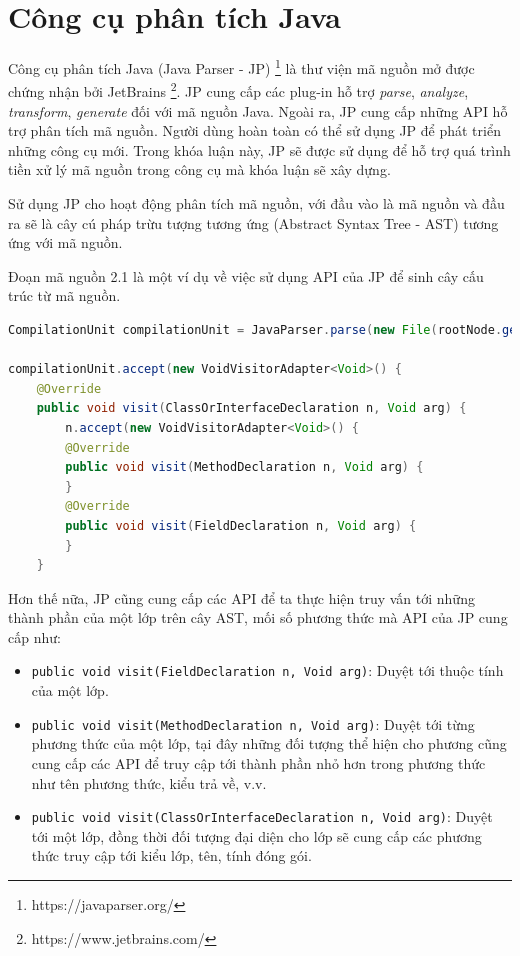 \documentclass[12pt]{report}
\begin{document}
\section{Công cụ phân tích Java}
Công cụ phân tích Java (Java Parser - JP) \footnote{https://javaparser.org/} là thư viện mã nguồn mở được chứng nhận bởi JetBrains \footnote{https://www.jetbrains.com/}. JP cung cấp các plug-in hỗ trợ \textit{parse}, \textit{analyze}, \textit{transform}, \textit{generate } đối với mã nguồn Java. Ngoài ra, JP cung cấp những API hỗ trợ phân tích mã nguồn. Người dùng hoàn toàn có thể sử dụng JP để phát triển những công cụ mới. Trong khóa luận này, JP sẽ được sử dụng để hỗ trợ quá trình tiền xử lý mã nguồn trong công cụ mà khóa luận sẽ xây dựng.

\noindent Sử dụng JP cho hoạt động phân tích mã nguồn, với đầu vào là mã nguồn và đầu ra sẽ là cây cú pháp trừu tượng tương ứng (Abstract Syntax Tree - AST) tương ứng với mã nguồn.

\noindent Đoạn mã nguồn 2.1 là một ví dụ về việc sử dụng API của  JP để sinh cây cấu trúc từ mã nguồn. 
\newpage
\begin{lstlisting}[language=Java,
caption={Sử dụng API của JavaParser để sinh cây cú pháp trừu tượng từ mã nguồn},label={code:jdt-ast-gen}]
CompilationUnit compilationUnit = JavaParser.parse(new File(rootNode.getAbsolutePath()));

compilationUnit.accept(new VoidVisitorAdapter<Void>() {
	@Override
	public void visit(ClassOrInterfaceDeclaration n, Void arg) {
		n.accept(new VoidVisitorAdapter<Void>() {
		@Override
		public void visit(MethodDeclaration n, Void arg) {
		}
		@Override
		public void visit(FieldDeclaration n, Void arg) {
		}
	}
\end{lstlisting}
Hơn thế nữa, JP cũng cung cấp các API để ta thực hiện truy vấn tới những thành phần của một lớp trên cây AST, mối số phương thức mà API của JP cung cấp như:
\begin{itemize}
	\item \texttt{public void visit(FieldDeclaration n, Void arg)}: Duyệt tới thuộc tính của một lớp.
	\item \texttt{public void visit(MethodDeclaration n, Void arg)}: Duyệt tới từng phương thức của một lớp, tại đây những đối tượng thể hiện cho phương cũng cung cấp các API để truy cập tới thành phần nhỏ hơn trong phương thức như tên phương thức, kiểu trả về, v.v.
	\item \texttt{public void visit(ClassOrInterfaceDeclaration n, Void arg)}: Duyệt tới một lớp, đồng thời đối tượng đại diện cho lớp sẽ cung cấp các phương thức truy cập tới kiểu lớp, tên, tính đóng gói.
\end{itemize}
\end{document}

